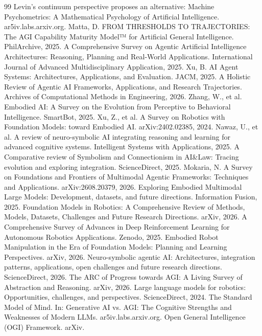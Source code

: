 \documentclass[12pt,a4paper]{article}
\begin{document}
\begin{thebibliography}{99}
 Levin’s continuum perspective proposes an alternative: Machine Psychometrics: A Mathematical Psychology of Artificial Intelligence. ar5iv.labs.arxiv.org.
 Matta, D. FROM THRESHOLDS TO TRAJECTORIES: The AGI Capability Maturity Model™ for Artificial General Intelligence. PhilArchive, 2025.
 A Comprehensive Survey on Agentic Artificial Intelligence Architectures: Reasoning, Planning and Real-World Applications. International Journal of Advanced Multidisciplinary Application, 2025.
 Xu, B. AI Agent Systems: Architectures, Applications, and Evaluation. JACM, 2025.
 A Holistic Review of Agentic AI Frameworks, Applications, and Research Trajectories. Archives of Computational Methods in Engineering, 2026.
 Zhang, W., et al. Embodied AI: A Survey on the Evolution from Perceptive to Behavioral Intelligence. SmartBot, 2025.
 Xu, Z., et al. A Survey on Robotics with Foundation Models: toward Embodied AI. arXiv:2402.02385, 2024.
 Nawaz, U., et al. A review of neuro-symbolic AI integrating reasoning and learning for advanced cognitive systems. Intelligent Systems with Applications, 2025.
 A Comparative review of Symbolism and Connectionism in AI\&Law: Tracing evolution and exploring integration. ScienceDirect, 2025.
 Mokaria, N. A Survey on Foundations and Frontiers of Multimodal Agentic Frameworks: Techniques and Applications. arXiv:2608.20379, 2026.
 Exploring Embodied Multimodal Large Models: Development, datasets, and future directions. Information Fusion, 2025.
 Foundation Models in Robotics: A Comprehensive Review of Methods, Models, Datasets, Challenges and Future Research Directions. arXiv, 2026.
 A Comprehensive Survey of Advances in Deep Reinforcement Learning for Autonomous Robotics Applications. Zenodo, 2025.
 Embodied Robot Manipulation in the Era of Foundation Models: Planning and Learning Perspectives. arXiv, 2026.
 Neuro-symbolic agentic AI: Architectures, integration patterns, applications, open challenges and future research directions. ScienceDirect, 2026.
 The ARC of Progress towards AGI: A Living Survey of Abstraction and Reasoning. arXiv, 2026.
 Large language models for robotics: Opportunities, challenges, and perspectives. ScienceDirect, 2024.
 The Standard Model of Mind. In: Generative AI vs. AGI: The Cognitive Strengths and Weaknesses of Modern LLMs. ar5iv.labs.arxiv.org.
 Open General Intelligence (OGI) Framework. arXiv.
\end{thebibliography}
\end{document}

